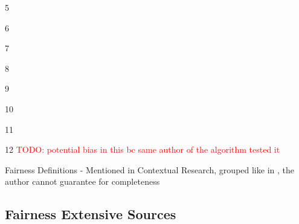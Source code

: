 \documentclass[12pt, a4paper, oneside]{book}   	%
\renewcommand{\todo}[1]{\textcolor{red}{TODO: #1}}
\newif\ifrawcitationactive
\newcommand{\rawcitationstart}{\color{purple}\rawcitationactivetrue}
\begin{document}
\begin{table}[H]
\begin{threeparttable}
\begin{tablenotes}
\begin{minipage}{0.33\textwidth}
						\end{minipage}%
						\begin{minipage}{0.33\textwidth}\raggedright
							\item[5] \autocite{M87_Kusner_2017}
							\item[6] \autocite{M61_Grgic-Hlaca_2016}
							\item[7] \autocite{M15_Berk_2017}
							\item[8] \autocite{M34_Chouldechova_2017}
						\end{minipage}%
						\begin{minipage}{0.33\textwidth}\raggedright
							\item[9] \autocite{M50_Farnadi_2018}
							\item[10] \autocite{M41_Corbett-Davies_2017}
							\item[11] \autocite{M79_Kearns_2018}
							\item[12] \autocite{M80_Kearns_2019} \todo{potential bias in this bc same author of the algorithm tested it}
						\end{minipage}%
					\end{tablenotes}
				\end{threeparttable}
				\caption{Fairness Definitions - Mentioned in Contextual Research, grouped like in \cite{Mehrabi_2021}, the author cannot guarantee for completeness}
				\label{tab:fairness_definitions}
			\end{table}
			
			\rawcitationstart
			\subsection{Fairness Extensive Sources}
\end{document}
